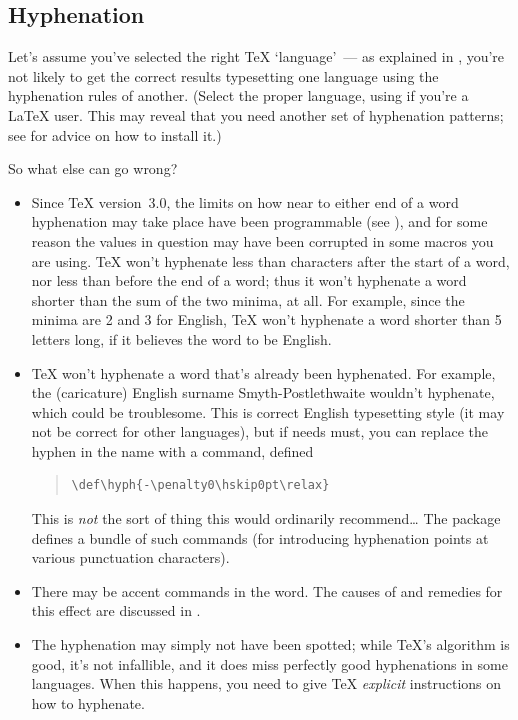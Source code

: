 \subsection{Hyphenation}


Let's assume you've selected the right \TeX{} `language'~--- as
explained in ,
you're not likely to get the correct results typesetting one language
using the hyphenation rules of another.  (Select the proper language,
using  if you're a \LaTeX{} user.  This may reveal that
you need another set of hyphenation patterns; see
 for advice on how
to install it.)

So what else can go wrong?
\begin{itemize}
\item Since \TeX{} version~3.0, the limits on how near to either end
  of a word hyphenation may take place have been programmable (see
  ), and for some
  reason the values in question may have been corrupted in some macros
  you are using.  \TeX{} won't hyphenate less than 
  characters after the start of a word, nor less than
   before the end of a word; thus it won't
  hyphenate a word shorter than the sum of the two minima, at all.
  For example, since the minima are 2 and 3 for English, \TeX{} won't
  hyphenate a word shorter than 5 letters long, if it believes the
  word to be English.
\item \TeX{} won't hyphenate a word that's already been hyphenated.
  For example, the (caricature) English surname Smyth-Postlethwaite
  wouldn't hyphenate, which could be troublesome.  This is correct
  English typesetting style (it may not be correct for other
  languages), but if needs must, you can replace the hyphen in the
  name with a  command, defined
\begin{quote}
\begin{verbatim}
\def\hyph{-\penalty0\hskip0pt\relax}
\end{verbatim}
\end{quote}
  This is \emph{not} the sort of thing this  would
  ordinarily recommend\dots{} The  package defines a
  bundle of such commands (for introducing hyphenation points at
  various punctuation characters).
\item There may be accent commands in the word.  The causes of and
  remedies for this effect are discussed in %
  .
\item The hyphenation may simply not have been spotted; while \TeX{}'s
  algorithm is good, it's not infallible, and it does miss perfectly
  good hyphenations in some languages.  When this happens, you need to
  give \TeX{} \emph{explicit} instructions on how to hyphenate.
\end{itemize}
